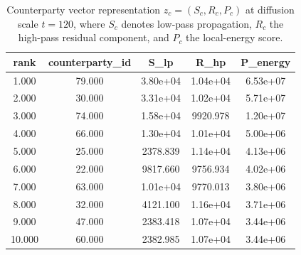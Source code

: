 \begin{table}[t]
\centering
\small
\setlength{\tabcolsep}{5pt}
\begin{tabular}{ccccc}
\toprule
rank & counterparty_id & S_lp & R_hp & P_energy \\
\midrule
1.000 & 79.000 & 3.80e+04 & 1.04e+04 & 6.53e+07 \\
2.000 & 30.000 & 3.31e+04 & 1.02e+04 & 5.71e+07 \\
3.000 & 74.000 & 1.58e+04 & 9920.978 & 1.20e+07 \\
4.000 & 66.000 & 1.30e+04 & 1.01e+04 & 5.00e+06 \\
5.000 & 25.000 & 2378.839 & 1.14e+04 & 4.13e+06 \\
6.000 & 22.000 & 9817.660 & 9756.934 & 4.02e+06 \\
7.000 & 63.000 & 1.01e+04 & 9770.013 & 3.80e+06 \\
8.000 & 32.000 & 4121.100 & 1.16e+04 & 3.71e+06 \\
9.000 & 47.000 & 2383.418 & 1.07e+04 & 3.44e+06 \\
10.000 & 60.000 & 2382.985 & 1.07e+04 & 3.44e+06 \\
\bottomrule
\end{tabular}
\caption{Counterparty vector representation $z_c=(S_c,R_c,P_c)$ at diffusion scale $t=120$, where $S_c$ denotes low-pass propagation, $R_c$ the high-pass residual component, and $P_c$ the local-energy score.}
\label{tab:counterparty_vector}
\end{table}